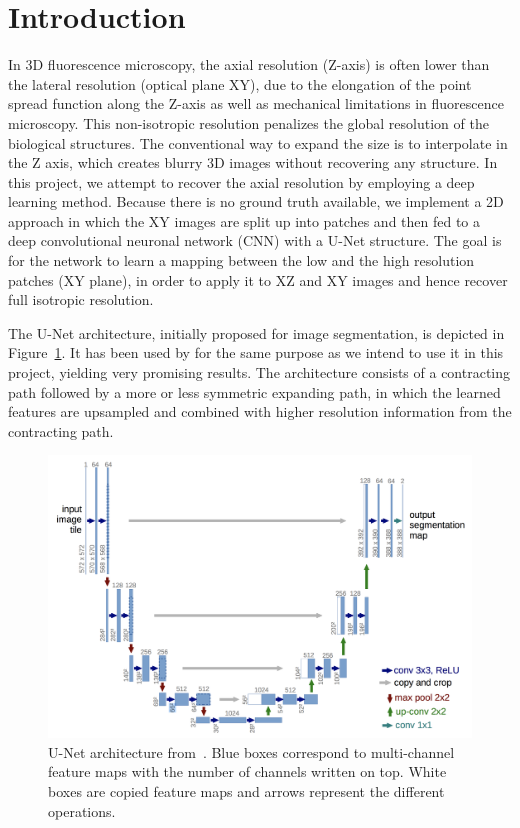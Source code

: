 \documentclass[a4paper, 12pt]{article} %
\begin{document}
\section{Introduction}
In 3D fluorescence microscopy, the axial resolution (Z-axis) is often lower than the lateral resolution (optical plane XY), due to the elongation of the point spread function along the Z-axis as well as mechanical limitations in fluorescence microscopy. This non-isotropic resolution penalizes the global resolution of the biological structures. The conventional way to expand the size is to interpolate in the Z axis, which creates blurry 3D images without recovering any structure. In this project, we attempt to recover the axial resolution by employing a deep learning method. Because there is no ground truth available, we implement a 2D approach in which the XY images are split up into patches and then fed to a deep convolutional neuronal network (CNN) with a U-Net \citep{unet} structure. The goal is for the network to learn a mapping between the low and the high resolution patches (XY plane), in order to apply it to XZ and XY images and hence recover full isotropic resolution.

The U-Net architecture, initially proposed for image segmentation, is depicted in Figure~\ref{fig:unet}. It has been used by \citet{WEIGERT2017} for the same purpose as we intend to use it in this project, yielding very promising results. The architecture consists of a contracting path followed by a more or less symmetric expanding path, in which the learned features are upsampled and combined with higher resolution information from the contracting path.

\begin{figure}[h]
    \begin{center}
        \includegraphics[width=0.8\columnwidth]{figures/unet.png}
        \caption{U-Net architecture from~\cite{unet}\label{fig:unet}. Blue boxes correspond to multi-channel feature maps with the number of channels written on top. White boxes are copied feature maps and arrows represent the different operations.}
    \end{center}
\end{figure}
\end{document}

